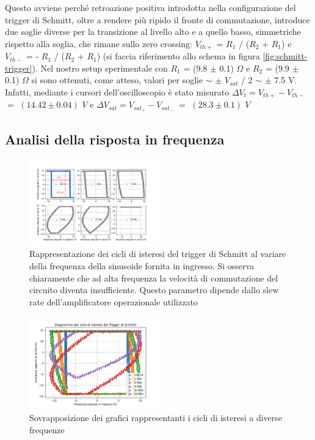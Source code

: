 \documentclass[journal]{IEEEtran}
\begin{document}
Questo avviene perché retroazione positiva introdotta nella configurazione del trigger di Schmitt, oltre a rendere più ripido il fronte di commutazione, introduce due soglie diverse per la transizione al livello alto e a quello basso, simmetriche rispetto alla soglia, che rimane sullo zero crossing: $V_{th+}$ = $R_1$ / ($R_2$ + $R_1$) e $V_{th-}$ = - $R_1$ / ($R_2$ + $R_1$) (si faccia riferimento allo schema in figura \ref{fig:schmitt-trigger}). Nel nostro setup sperimentale con $R_1$ = (9.8 $\pm$ 0.1) $\Omega$ e $R_2$ = (9.9 $\pm$ 0.1) $\Omega$ si sono ottenuti, come atteso, valori per soglie $\sim$ $\pm$ $V_{sat}$ / 2 $\sim$ $\pm$ 7.5 V. Infatti, mediante i cursori dell'oscilloscopio è stato misurato $\Delta V_t  = V_{th+}-V_{th-}$ $=$ $(14.42 \pm 0.04) $ $V$ e $\Delta V_{sat}  = V_{sat_+}-V_{sat_{-}}$ $=$ $(28.3 \pm 0.1)$ $ V$



\subsection{\textbf{Analisi della risposta in frequenza}}




\begin{figure}[H]%
\begin {center}
\includegraphics[trim = {30pt 0 0 0}, width=0.50\textwidth]{analysis/output/OPA-trigger-histeresis-table.pdf}
\caption{Rappresentazione dei cicli di isteresi del trigger di Schmitt al variare della frequenza della sinusoide fornita in ingresso. Si osserva chiaramente che ad alta frequenza la velocità di commutazione del circuito diventa insufficiente. Questo parametro dipende dallo slew rate dell'amplificatore operazionale utilizzato }
\label{fig:hyst-table}
\end {center}
\end{figure}

\begin{figure}[H]%
\begin {center}
\includegraphics[width=0.50\textwidth]{analysis/output/OPA-trigger-histeresis-overlapped.pdf}
\caption{Sovrapposizione dei grafici rappresentanti i cicli di isteresi a diverse frequenze}
\label{fig:trigger-hyst}
\end {center}
\end{figure}
\end{document}
